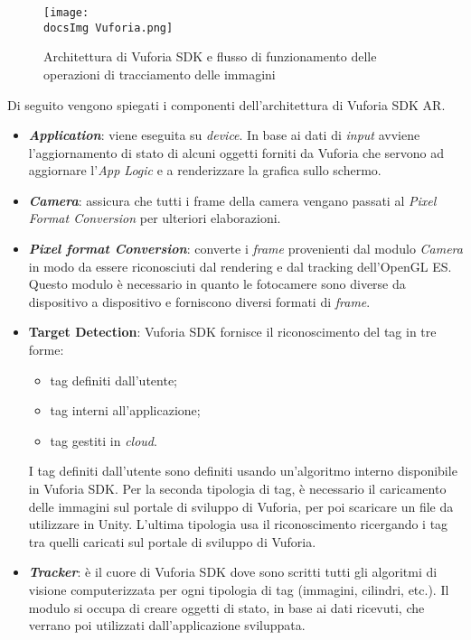 \begin{figure}[H]
	\centering
	\texttt{[image: \\docsImg Vuforia.png]}
	\caption{Architettura di Vuforia SDK e flusso di funzionamento delle operazioni di tracciamento delle immagini}
	\label{fig:Architettura di Vuforia SDK e flusso di funzionamento delle operazioni di tracciamento delle immagini
	}
\end{figure}

Di seguito vengono spiegati i componenti dell'architettura di Vuforia SDK AR.

\begin{itemize}
	\item \textbf{\textit{Application}}: viene eseguita su \textit{device}. In base ai dati di \textit{input} avviene l'aggiornamento di stato di alcuni oggetti forniti da Vuforia che servono ad aggiornare l'\textit{App Logic} e a renderizzare la grafica sullo schermo.
	\item  \textbf{\textit{Camera}}: assicura che tutti i frame della camera vengano passati al \textit{Pixel Format Conversion} per ulteriori elaborazioni.
	\item \textbf{\textit{Pixel format Conversion}}: converte i \textit{frame} provenienti dal modulo \textit{Camera} in modo da essere riconosciuti dal rendering e dal tracking dell'OpenGL ES. Questo modulo \`e necessario in quanto le fotocamere sono diverse da dispositivo a dispositivo e forniscono diversi formati di \textit{frame}.
	\item \textbf{Target Detection}: Vuforia SDK fornisce il riconoscimento del tag in tre forme:
	\begin{itemize}
		\item tag definiti dall'utente;
		\item tag interni all'applicazione;
		\item tag gestiti in \textit{cloud}.
	\end{itemize} 
	I tag definiti dall'utente sono definiti usando un'algoritmo interno disponibile in Vuforia SDK. Per la seconda tipologia di tag, \`e necessario il caricamento delle immagini sul portale di sviluppo di Vuforia, per poi scaricare un file da utilizzare in Unity. L'ultima tipologia usa il riconoscimento ricergando i tag tra quelli caricati sul portale di sviluppo di Vuforia.
	\item \textbf{\textit{Tracker}}: \`e il cuore di Vuforia SDK dove sono scritti tutti gli algoritmi di visione computerizzata per ogni tipologia di tag (immagini, cilindri, etc.). Il modulo si occupa di creare oggetti di stato, in base ai dati ricevuti, che verrano poi utilizzati dall'applicazione sviluppata.
\end{itemize}



